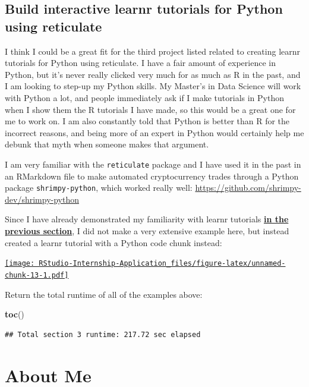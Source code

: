 \documentclass[
]{book}
\newenvironment{Shaded}{\begin{snugshade}}{\end{snugshade}}
\newcommand{\KeywordTok}[1]{\textcolor[rgb]{0.13,0.29,0.53}{\textbf{#1}}}
\newcommand{\NormalTok}[1]{#1}
\begin{document}
\hypertarget{build-interactive-learnr-tutorials-for-python-using-reticulate}{%
\section{Build interactive learnr tutorials for Python using reticulate}\label{build-interactive-learnr-tutorials-for-python-using-reticulate}}

I think I could be a great fit for the third project listed related to creating learnr tutorials for Python using reticulate. I have a fair amount of experience in Python, but it's never really clicked very much for as much as R in the past, and I am looking to step-up my Python skills. My Master's in Data Science will work with Python a lot, and people immediately ask if I make tutorials in Python when I show them the R tutorials I have made, so this would be a great one for me to work on. I am also constantly told that Python is better than R for the incorrect reasons, and being more of an expert in Python would certainly help me debunk that myth when someone makes that argument.

I am very familiar with the \texttt{reticulate} package and I have used it in the past in an RMarkdown file to make automated cryptocurrency trades through a Python package \texttt{shrimpy-python}, which worked really well: \url{https://github.com/shrimpy-dev/shrimpy-python}

Since I have already demonstrated my familiarity with learnr tutorials \textbf{\protect\hyperlink{learnr}{in the previous section}}, I did not make a very extensive example here, but instead created a learnr tutorial with a Python code chunk instead:

\href{https://predictcrypto.shinyapps.io/python_project3_example/}{\texttt{[image: RStudio-Internship-Application\_files/figure-latex/unnamed-chunk-13-1.pdf]}}

Return the total runtime of all of the examples above:

\begin{Shaded}
\begin{Highlighting}[]
\KeywordTok{toc}\NormalTok{()}
\end{Highlighting}
\end{Shaded}

\begin{verbatim}
## Total section 3 runtime: 217.72 sec elapsed
\end{verbatim}

\hypertarget{about-me}{%
\chapter{About Me}\label{about-me}}
\end{document}

